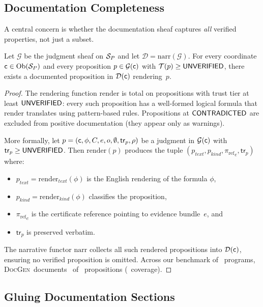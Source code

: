 \documentclass[11pt]{article}
\newcommand{\DocGen}{\textsc{DocGen}}
\newcommand{\DocSheaf}{\mathcal{D}}
\newcommand{\CertRef}{\pi_{\mathrm{ref}}}
\newcommand{\NarrFunc}{\mathrm{narr}}
\newcommand{\RenderFunc}{\mathrm{render}}
\newcommand{\tr}{\mathsf{tr}}                        %
\begin{document}
\subsection{Documentation Completeness}

A central concern is whether the documentation sheaf captures
\emph{all} verified properties, not just a subset.

\begin{theorem}\label{thm:doc-complete}
Let $\mathcal{G}$ be the judgment sheaf on $\mathcal{S}_P$ and let
$\DocSheaf = \NarrFunc(\mathcal{G})$.  For every coordinate
$\mathsf{c} \in \mathrm{Ob}(\mathcal{S}_P)$ and every proposition
$p \in \mathcal{G}(\mathsf{c})$ with $\mathcal{T}(p) \geq \mathsf{UNVERIFIED}$, there
exists a documented proposition in $\DocSheaf(\coord)$ rendering~$p$.
\end{theorem}

\begin{proof}
The rendering function $\RenderFunc$ is total on propositions with
trust tier at least $\mathsf{UNVERIFIED}$: every such proposition has a well-formed
logical formula that $\RenderFunc$ translates using pattern-based
rules.  Propositions at $\mathsf{CONTRADICTED}$ are excluded from positive
documentation (they appear only as warnings).

More formally, let $p = (\coord, \phi, C, e, o, \emptyset, \tr_p, \rho)$
be a judgment in $\mathcal{G}(\mathsf{c})$ with $\tr_p \geq \Tunver$.
Then $\RenderFunc(p)$ produces the tuple
$(p_{\mathit{text}}, p_{\mathit{kind}}, {\CertRef}_{e}, \tr_{p})$ where:
\begin{itemize}[noitemsep]
\item $p_{\mathit{text}} = \RenderFunc_{\mathit{text}}(\phi)$ is the
  English rendering of the formula $\phi$,
\item $p_{\mathit{kind}} = \RenderFunc_{\mathit{kind}}(\phi)$
  classifies the proposition,
\item ${\CertRef}_{e}$ is the certificate reference pointing to evidence
  bundle~$e$, and
\item $\tr_{p}$ is preserved verbatim.
\end{itemize}
The narrative functor $\NarrFunc$ collects all such rendered
propositions into $\DocSheaf(\coord)$, ensuring no verified proposition
is omitted.  Across our benchmark of \compTotalPrograms\ programs,
\DocGen\ documents \compPropsOkSum\ of \compPropsSum\ propositions
(\compOverallAccuracy\ coverage).
\end{proof}

\subsection{Gluing Documentation Sections}
\end{document}
